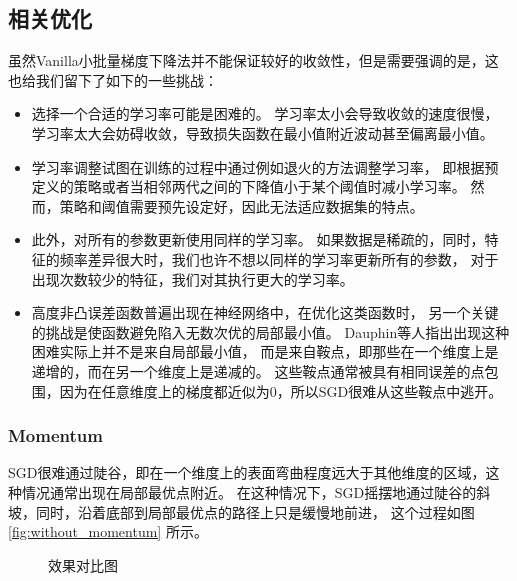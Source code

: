 \documentclass[a4paper,10pt]{ctexbook}
\providecommand{\pathroot}{../..}
\begin{document}
\subsection{相关优化}
虽然Vanilla小批量梯度下降法并不能保证较好的收敛性，但是需要强调的是，这也给我们留下了如下的一些挑战：
\begin{itemize}
    \item 选择一个合适的学习率可能是困难的。
          学习率太小会导致收敛的速度很慢，学习率太大会妨碍收敛，导致损失函数在最小值附近波动甚至偏离最小值。

    \item 学习率调整试图在训练的过程中通过例如退火的方法调整学习率，
          即根据预定义的策略或者当相邻两代之间的下降值小于某个阈值时减小学习率。
          然而，策略和阈值需要预先设定好，因此无法适应数据集的特点。

    \item 此外，对所有的参数更新使用同样的学习率。
          如果数据是稀疏的，同时，特征的频率差异很大时，我们也许不想以同样的学习率更新所有的参数，
          对于出现次数较少的特征，我们对其执行更大的学习率。

    \item 高度非凸误差函数普遍出现在神经网络中，在优化这类函数时，
          另一个关键的挑战是使函数避免陷入无数次优的局部最小值。
          Dauphin等人指出出现这种困难实际上并不是来自局部最小值，
          而是来自鞍点，即那些在一个维度上是递增的，而在另一个维度上是递减的。
          这些鞍点通常被具有相同误差的点包围，因为在任意维度上的梯度都近似为0，所以SGD很难从这些鞍点中逃开。
\end{itemize}

\subsubsection{Momentum}
SGD很难通过陡谷，即在一个维度上的表面弯曲程度远大于其他维度的区域，这种情况通常出现在局部最优点附近。
在这种情况下，SGD摇摆地通过陡谷的斜坡，同时，沿着底部到局部最优点的路径上只是缓慢地前进，
这个过程如图 \ref{fig:without_momentum} 所示。

\begin{figure}[H]
    \caption{效果对比图}
\end{figure}
\end{document}

